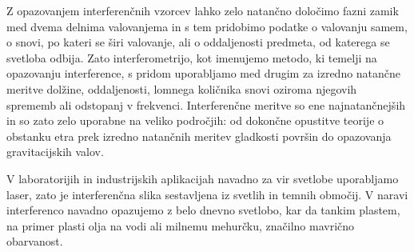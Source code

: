 Z opazovanjem interferenčnih vzorcev lahko zelo natančno določimo fazni zamik med
dvema delnima valovanjema in s tem pridobimo podatke o valovanju samem, o snovi, po 
kateri se širi valovanje, ali o oddaljenosti predmeta, od katerega se svetloba odbija. 
Zato interferometrijo, kot imenujemo metodo, ki temelji na opazovanju interference,
s pridom uporabljamo med drugim za izredno natančne meritve dolžine, 
oddaljenosti, lomnega količnika snovi oziroma njegovih sprememb ali odstopanj v frekvenci. 
Interferenčne meritve so ene najnatančnejših in so zato zelo uporabne na veliko področjih: od 
dokončne opustitve teorije o obstanku etra prek izredno natančnih meritev gladkosti površin do
opazovanja gravitacijskih valov.

V laboratorijih in industrijskih aplikacijah navadno za vir svetlobe uporabljamo laser, zato
je interferenčna slika sestavljena iz svetlih in temnih območij. V naravi interferenco
navadno opazujemo z belo dnevno svetlobo, kar da tankim plastem, na primer plasti olja na vodi ali
milnemu mehurčku, značilno mavrično obarvanost.\vfill

